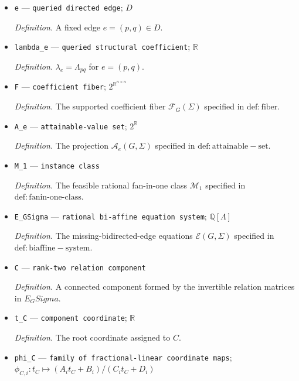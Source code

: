 \documentclass{article}
\begin{document}
\begin{itemize}
  \par\smallskip\noindent\emph{Definition.} \(\Omega(\Lambda)=(I_n-\Lambda)^{\mathsf T}\Sigma(I_n-\Lambda)\).
  \item \texttt{e} --- \texttt{queried directed edge}; \(D\)
  \par\smallskip\noindent\emph{Definition.} A fixed edge \(e=(p,q)\in D\).
  \item \texttt{lambda\_\allowbreak{}e} --- \texttt{queried structural coefficient}; \(\mathbb R\)
  \par\smallskip\noindent\emph{Definition.} \(\lambda_e=\Lambda_{pq}\) for \(e=(p,q)\).
  \item \texttt{F} --- \texttt{coefficient fiber}; \(2^{\mathbb R^{n\times n}}\)
  \par\smallskip\noindent\emph{Definition.} The supported coefficient fiber \(\mathcal F_G(\Sigma)\) specified in \(\mathrm{def:fiber}\).
  \item \texttt{A\_\allowbreak{}e} --- \texttt{attainable-\allowbreak{}value set}; \(2^{\mathbb R}\)
  \par\smallskip\noindent\emph{Definition.} The projection \(\mathcal A_e(G,\Sigma)\) specified in \(\mathrm{def:attainable-set}\).
  \item \texttt{M\_\allowbreak{}1} --- \texttt{instance class}
  \par\smallskip\noindent\emph{Definition.} The feasible rational fan-in-one class \(\mathcal M_1\) specified in \(\mathrm{def:fanin\mbox{-}one\mbox{-}class}\).
  \item \texttt{E\_\allowbreak{}GSigma} --- \texttt{rational bi-\allowbreak{}affine equation system}; \(\mathbb Q[\Lambda]\)
  \par\smallskip\noindent\emph{Definition.} The missing-bidirected-edge equations \(\mathcal E(G,\Sigma)\) specified in \(\mathrm{def:biaffine-system}\).
  \item \texttt{C} --- \texttt{rank-\allowbreak{}two relation component}
  \par\smallskip\noindent\emph{Definition.} A connected component formed by the invertible relation matrices in \(E_GSigma\).
  \item \texttt{t\_\allowbreak{}C} --- \texttt{component coordinate}; \(\mathbb R\)
  \par\smallskip\noindent\emph{Definition.} The root coordinate assigned to \(C\).
  \item \texttt{phi\_\allowbreak{}C} --- \texttt{family of fractional-\allowbreak{}linear coordinate maps}; \(\phi_{C,i}:t_C\mapsto (A_i t_C+B_i)/(C_i t_C+D_i)\)

\end{itemize}
\end{document}
